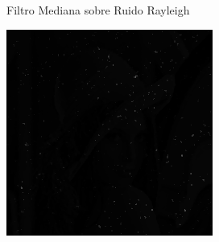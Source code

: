 \documentclass{beamer}
\begin{document}
\begin{frame}[fragile]{Filtro Mediana sobre Ruido Rayleigh}
\begin{minipage}{0.25\linewidth}
	\end{minipage}\hfill
	\begin{minipage}{0.25\linewidth}
		\centering
		\includegraphics[width=\linewidth]{../results/lena_rayleigh_xi10_mediana}
	\end{minipage}
\end{frame}
\end{document}
